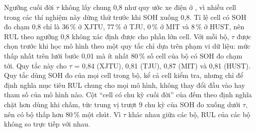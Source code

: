Ngưỡng cuối đời $\tau$ không lấy chung 0,8 như quy ước xe điện ở , vì nhiều cell trong các thí nghiệm này dừng thử trước khi SOH xuống 0,8. Tỉ lệ cell có SOH đo chạm 0,8 chỉ là 36\,\% ở XJTU, 77\,\% ở TJU, 0\,\% ở MIT và 8\,\% ở HUST, nên RUL theo ngưỡng 0,8 không xác định được cho phần lớn cell. Với mỗi bộ, $\tau$ được chọn trước khi học mô hình theo một quy tắc chỉ dựa trên phạm vi dữ liệu: mức thấp nhất trên lưới bước 0,01 mà ít nhất 80\,\% số cell của bộ có SOH đo chạm tới. Quy tắc này cho $\tau$ = 0{,}84 (XJTU), 0{,}81 (TJU), 0{,}87 (MIT) và 0{,}81 (HUST). Quy tắc dùng SOH đo của mọi cell trong bộ, kể cả cell kiểm tra, nhưng chỉ để định nghĩa mục tiêu RUL chung cho mọi mô hình, không thay đổi đầu vào hay tham số của mô hình nào. Cột ``cell có chu kỳ cuối đời'' của  đếm theo định nghĩa chặt hơn dùng khi chấm, tức trung vị trượt 9 chu kỳ của SOH đo xuống dưới $\tau$, nên có bộ thấp hơn 80\,\% một chút. Vì $\tau$ khác nhau giữa các bộ, RUL của các bộ không so trực tiếp với nhau.
